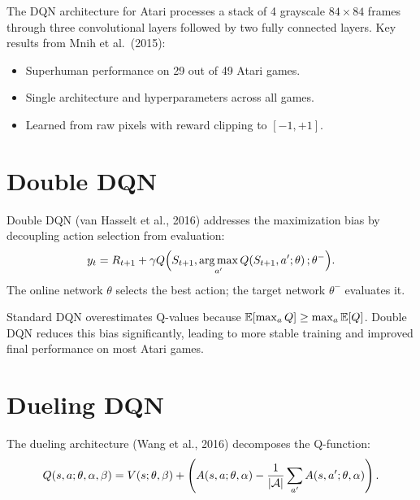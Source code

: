 \begin{example}
The DQN architecture for Atari processes a stack of 4 grayscale
$84 \times 84$ frames through three convolutional layers followed by
two fully connected layers. Key results from Mnih et al.\ (2015):
\begin{itemize}
    \item Superhuman performance on 29 out of 49 Atari games.
    \item Single architecture and hyperparameters across all games.
    \item Learned from raw pixels with reward clipping to $[-1, +1]$.
\end{itemize}
\end{example}

\section{Double DQN}
\label{sec:ddqn}

\begin{definition}
Double DQN (van Hasselt et al., 2016) addresses the maximization bias
by decoupling action selection from evaluation:
\[
    y_t = R_{t+1} + \gamma Q\Big(S_{t+1},
    \operatorname*{arg\,max}_{a'} Q(S_{t+1}, a'; \theta)\,; \theta^-\Big).
\]
The online network $\theta$ selects the best action; the target network
$\theta^-$ evaluates it.
\end{definition}

\begin{proposition}
Standard DQN overestimates Q-values because
$\mathbb{E}[\max_a Q] \geq \max_a \mathbb{E}[Q]$. Double DQN reduces this bias
significantly, leading to more stable training and improved final
performance on most Atari games.
\end{proposition}

\section{Dueling DQN}
\label{sec:dueling}

\begin{definition}
The dueling architecture (Wang et al., 2016) decomposes the Q-function:
\[
    Q(s, a; \theta, \alpha, \beta) = V(s; \theta, \beta)
    + \left( A(s, a; \theta, \alpha) - \frac{1}{\left| \mathcal{A} \right|}
    \sum_{a'} A(s, a'; \theta, \alpha) \right).
\]
\end{definition}

